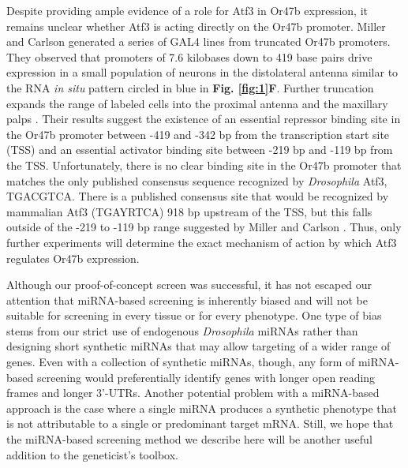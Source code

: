 Despite providing ample evidence of a role for Atf3 in Or47b expression, it remains unclear whether Atf3 is acting directly on the Or47b promoter.
Miller and Carlson generated a series of GAL4 lines from truncated Or47b promoters.
They observed that promoters of 7.6 kilobases down to 419 base pairs drive expression in a small population of neurons in the distolateral antenna similar to the RNA \emph{in situ} pattern circled in blue in \textbf{Fig. \ref{fig:1}F}.
Further truncation expands the range of labeled cells into the proximal antenna and the maxillary palps \cite{Miller_Carlson_2010}.
Their results suggest the existence of an essential repressor binding site in the Or47b promoter between -419 and -342 bp from the transcription start site (TSS) and an essential activator binding site between -219 bp and -119 bp from the TSS.
Unfortunately, there is no clear binding site in the Or47b promoter that matches the only published \cite{a_Bohmann_Jindra_Uhlirova_2009} consensus sequence recognized by \emph{Drosophila} Atf3, TGACGTCA.
There is a published \cite{Brodesser_Jindra_Uhlirova_2012} consensus site that would be recognized by mammalian Atf3 (TGAYRTCA) 918 bp upstream of the TSS, but this falls outside of the -219 to -119 bp range suggested by Miller and Carlson \cite{Miller_Carlson_2010}.
Thus, only further experiments will determine the exact mechanism of action by which Atf3 regulates Or47b expression.

Although our proof-of-concept screen was successful, it has not escaped our attention that miRNA-based screening is inherently biased and will not be suitable for screening in every tissue or for every phenotype.
One type of bias stems from our strict use of endogenous \emph{Drosophila} miRNAs rather than designing short synthetic miRNAs that may allow targeting of a wider range of genes.
Even with a collection of synthetic miRNAs, though, any form of miRNA-based screening would preferentially identify genes with longer open reading frames and longer 3'-UTRs.
Another potential problem with a miRNA-based approach is the case where a single miRNA produces a synthetic phenotype that is not attributable to a single or predominant target mRNA.
Still, we hope that the miRNA-based screening method we describe here will be another useful addition to the geneticist's toolbox.